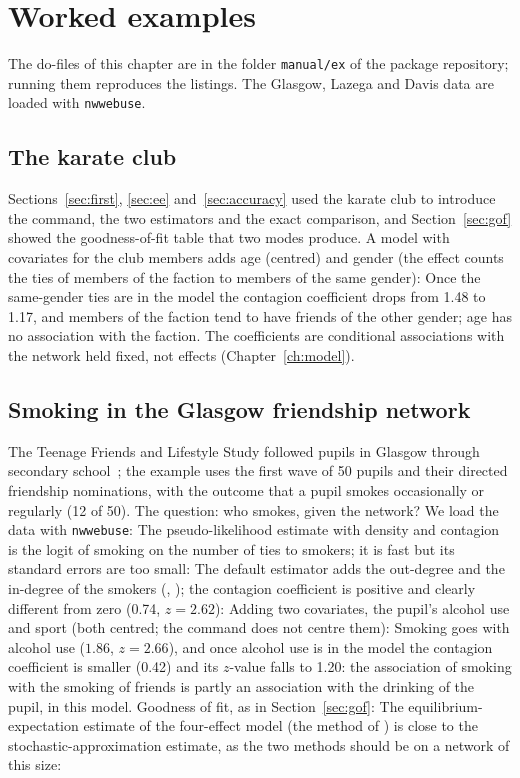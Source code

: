 \chapter{Worked examples}\label{ch:examples}

The do-files of this chapter are in the folder \texttt{manual/ex} of the package repository; running them reproduces the listings. The Glasgow, Lazega and Davis data are loaded with \texttt{nwwebuse}.

\section{The karate club}\label{sec:karate}

Sections~\ref{sec:first}, \ref{sec:ee} and~\ref{sec:accuracy} used the karate club to introduce the command, the two estimators and the exact comparison, and Section~\ref{sec:gof} showed the goodness-of-fit table that two modes produce. A model with covariates for the club members adds age (centred) and gender (the effect  counts the ties of members of the faction to members of the same gender):
Once the same-gender ties are in the model the contagion coefficient drops from 1.48 to 1.17, and members of the faction tend to have friends of the other gender; age has no association with the faction. The coefficients are conditional associations with the network held fixed, not effects (Chapter~\ref{ch:model}).

\section{Smoking in the Glasgow friendship network}\label{sec:ex-glasgow}

The Teenage Friends and Lifestyle Study followed pupils in Glasgow through secondary school~\cite{michell1996}; the example uses the first wave of 50 pupils and their directed friendship nominations, with the outcome that a pupil smokes occasionally or regularly (12 of 50). The question: who smokes, given the network? We load the data with \texttt{nwwebuse}:
The pseudo-likelihood estimate with density and contagion is the logit of smoking on the number of ties to smokers; it is fast but its standard errors are too small:
The default estimator adds the out-degree and the in-degree of the smokers (, ); the contagion coefficient is positive and clearly different from zero (0.74, $z=2.62$):
Adding two covariates, the pupil's alcohol use and sport (both centred; the command does not centre them):
Smoking goes with alcohol use ($1.86$, $z=2.66$), and once alcohol use is in the model the contagion coefficient is smaller (0.42) and its $z$-value falls to 1.20: the association of smoking with the smoking of friends is partly an association with the drinking of the pupil, in this model. Goodness of fit, as in Section~\ref{sec:gof}:
The equilibrium-expectation estimate of the four-effect model (the method of \alaamee{}) is close to the stochastic-approximation estimate, as the two methods should be on a network of this size:

